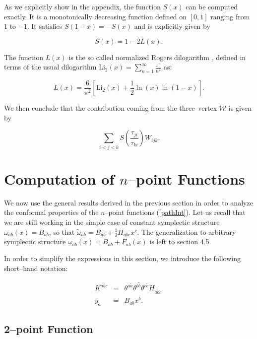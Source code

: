 \documentclass[a4paper,11pt]{article}
\begin{document}
\noindent
As we explicitly show in the appendix, the function $S\left( x\right) $ can
be computed exactly. It is a monotonically decreasing function defined on 
$\left[ 0,1\right] $ ranging from $1$ to $-1$. It 
satisfies $S\left( 1-x\right) =-S\left( x\right) $ and is explicitly 
given by

$$
S\left( x\right) =1-2L\left( x\right) .
$$

\noindent
The function $L\left( x\right) $ is the so called normalized Rogers
dilogarithm \cite{Rogers}, defined in terms of the usual dilogarithm 
$\mathrm{Li}_{2} \left( x\right) =\sum_{n=1}^{\infty }\frac{x^{n}}{n^{2}}$ 
as:

$$
L\left( x\right) =\frac{6}{\pi ^{2}}\left[ \mathrm{Li}_{2}\left( x\right) + 
\frac{1}{2}\ln \left( x\right) \ln \left( 1-x\right) \right] .
$$

\noindent
We then conclude that the contribution coming from the three--vertex 
$\mathcal{W}$ is given by 

$$
\sum_{i<j<k}S\left( \frac{\tau _{ji}}{\tau _{ki}}\right) W_{ijk}.
$$


\section{Computation of $n$--point Functions}


We now use the general results derived in the previous section in order 
to analyze the conformal properties of the $n$--point functions 
(\ref{pathInt}). Let us recall that we are still working in the simple 
case of constant symplectic structure $\omega _{ab}\left( x\right) 
=B_{ab}$, so that $\widetilde{\omega}_{ab} = B_{ab} + \frac{1}{3} 
H_{abc} x^{c}$. The generalization to arbitrary symplectic structure 
$\omega _{ab}\left( x\right) = B_{ab}+F_{ab}\left( x\right) $ is left to 
section 4.5.

In order to simplify the expressions in this section, we introduce the 
following short--hand notation:

\begin{eqnarray*}
K^{abc} &=&\theta ^{a\widetilde{a}}\theta ^{b\widetilde{b}} 
\theta^{c\widetilde{c}} H_{\widetilde{a}\widetilde{b}\widetilde{c}}\  \\
y_{a} &=&B_{ab}x^{b}.
\end{eqnarray*}


\subsection{2--point Function}
\end{document}

